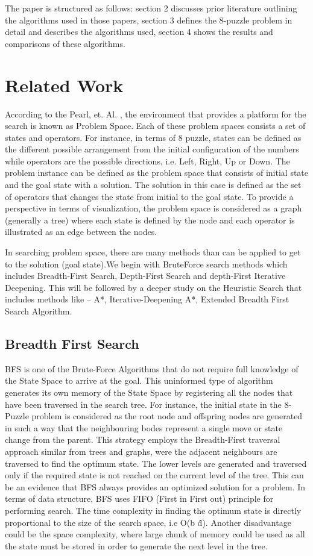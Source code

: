 \documentclass{svproc}
\begin{document}
\noindent The paper is structured as follows: section 2 discusses prior literature outlining the algorithms used in those papers,  section 3 defines the 8-puzzle problem in detail and describes the algorithms used, section 4 shows the results and comparisons of these algorithms.

\section{Related Work}

According to the Pearl, et. Al. , the environment that provides a platform for the search is known as Problem Space. Each of these problem spaces consists a set of states and operators. For instance, in terms of 8 puzzle, states can be defined as the different possible arrangement from the initial configuration of the numbers while operators are the possible directions, i.e. Left, Right, Up or Down. The problem instance can be defined as the problem space that consists of initial state and the goal state with a solution. The solution in this case is defined as the set of operators that changes the state from initial to the goal state. To provide a perspective in terms of visualization, the problem space is considered as a graph (generally a tree) where each state is defined by the node and each operator is illustrated as an edge between the nodes.

In searching problem space, there are many methods than can be applied to get to the solution (goal state).We begin with BruteForce search methods which includes Breadth-First Search, Depth-First Search and depth-First Iterative Deepening. This will be followed by a deeper study on the Heuristic Search that includes methods like – A*, Iterative-Deepening  A*, Extended Breadth First Search Algorithm.
\subsection{Breadth First Search}
BFS is one of the Brute-Force Algorithms that do not require full knowledge of the State Space to arrive at the goal. This uninformed type of algorithm generates its own memory of the State Space by registering all the nodes that have been traversed in the search tree. For instance, the initial state in the 8-Puzzle problem is considered as the root node and offspring nodes are generated in such a way that the neighbouring bodes represent a single move or state change from the parent. This strategy employs the Breadth-First traversal approach similar from trees and graphs, were the adjacent neighbours are traversed to find the optimum state. The lower levels are generated and traversed only if the required state is not reached on the current level of the tree. This can be an evidence that BFS always provides an optimized solution for a problem. In terms of data structure, BFS uses FIFO (First in First out) principle for performing search. The time complexity in finding the optimum state is directly proportional to the size of the search space, i.e O(b \^d). Another disadvantage could be the space complexity, where large chunk of memory could be used as all the state must be stored in order to generate the next level in the tree.
\end{document}
